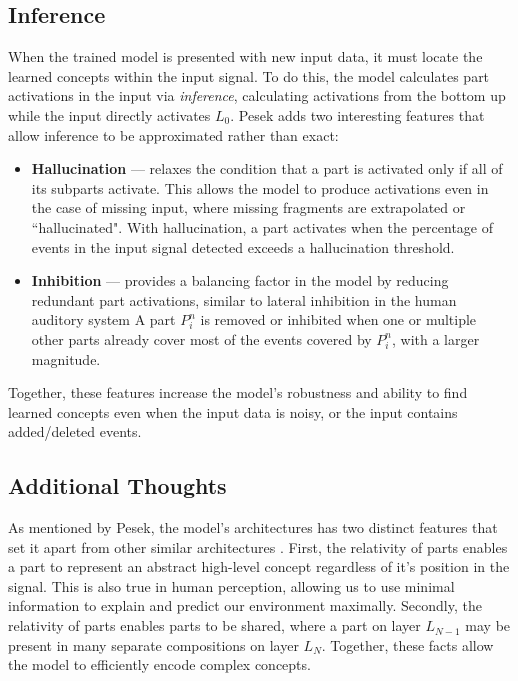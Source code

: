 \documentclass[../main.tex]{subfiles}
\begin{document}
\subsection{Inference}
When the trained model is presented with new input data, it must locate the learned concepts within the input signal. To do this, the model calculates part activations in the input via \textit{inference}, calculating activations from the bottom up while the input directly activates $L_0$. Pesek adds two interesting features that allow inference to be approximated rather than exact: 
\begin{itemize}
    \item \textbf{Hallucination} — relaxes the condition that a part is activated only if all of its subparts activate. This allows the model to produce activations even in the case of missing input, where missing fragments are extrapolated or ``hallucinated". With hallucination, a part activates when the percentage of events in the input signal detected exceeds a hallucination threshold.
    
    \item \textbf{Inhibition} — provides a balancing factor in the model by reducing redundant part activations, similar to lateral inhibition in the human auditory system %
    A part $P^n_i$ is removed or inhibited when one or multiple other parts already cover most of the events covered by $P^n_i$, with a larger magnitude.
\end{itemize}

Together, these features increase the model's robustness and ability to find learned concepts even when the input data is noisy, or the input contains added/deleted events. 

\subsection{Additional Thoughts}
As mentioned by Pesek, the model's architectures has two distinct features that set it apart from other similar architectures \cite{Pesek:1}. First, the relativity of parts enables a part to represent an abstract high-level concept regardless of it's position in the signal. This is also true in human perception, allowing us to use minimal information to explain and predict our environment maximally. Secondly, the relativity of parts enables parts to be shared, where a part on layer $L_{N-1}$ may be present in many separate compositions on layer $L_N$. Together, these facts allow the model to efficiently encode complex concepts. 
\end{document}
